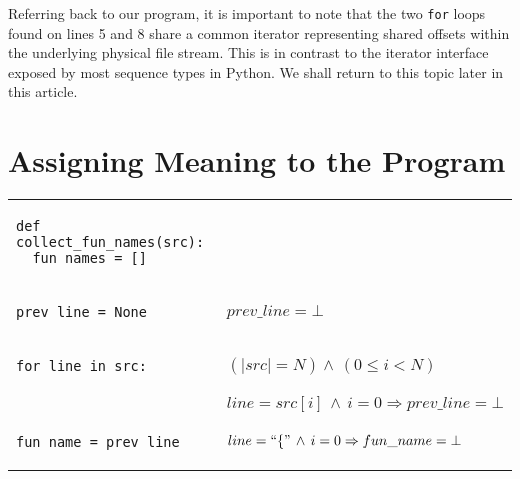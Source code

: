 \documentclass[10pt, a4paper]{article}
\begin{document}
Referring back to our program, it is important to note that the two \texttt{for} loops found on lines 5 and 8 share a common iterator representing shared offsets within the underlying physical file stream. This is in contrast to the iterator interface exposed by most sequence types in Python. We shall return to this topic later in this article.


\section{Assigning Meaning to the Program}
\noindent
\noindent\hspace*{-0.5em}\begin{tabular}{@{}ll@{}}
{\noindent\lstset{language=Python, basicstyle=\ttfamily\small, numbers=left}
\noindent\begin{lstlisting}
def collect_fun_names(src):
  fun_names = []
\end{lstlisting}}
&\\

{\noindent\lstset{language=Python, numbers=left, backgroundcolor=\color{lightgreen}}
\begin{lstlisting}[firstnumber=3]
  prev_line = None
\end{lstlisting}}
&$prev\_line = \bot$\\

{\noindent\lstset{numbers=left, backgroundcolor=\color{lightgreen}}
\noindent\begin{lstlisting}[firstnumber=last]
  for line in src:
\end{lstlisting}}
& $(|src| = N) \wedge\,(0 \le i < N) $\\

\noindent\lstset{backgroundcolor=\color{lightgreen}}
\noindent{\begin{lstlisting}[firstnumber=last]
    if open_curly(line):
\end{lstlisting}}
& $line = src[i]\,\wedge\,i = 0 \Rightarrow prev\_line = \bot$\\

\noindent\lstset{backgroundcolor=\color{lightgreen}}
{\begin{lstlisting}[firstnumber=last]
      fun_name = prev_line
\end{lstlisting}}
&$line = ``\{" \,\wedge\,i = 0 \Rightarrow fun\_name = \bot $\\


\end{tabular}
\end{document}
